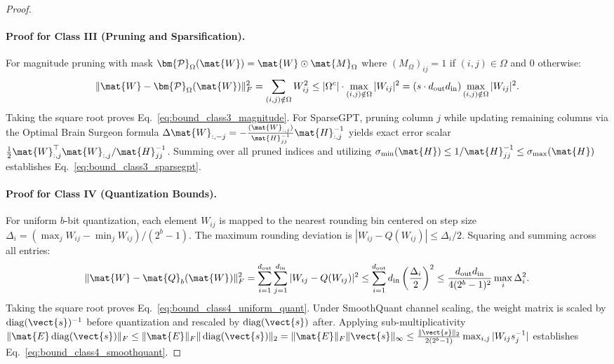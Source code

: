 \begin{proof}
\paragraph{Proof for Class III (Pruning and Sparsification).}
For magnitude pruning with mask $\bm{\mathcal{P}}_\Omega(\mat{W}) = \mat{W} \odot \mat{M}_\Omega$ where $(M_\Omega)_{ij} = 1$ if $(i,j) \in \Omega$ and $0$ otherwise:
\begin{equation}
\|\mat{W} - \bm{\mathcal{P}}_\Omega(\mat{W})\|_F^2 = \sum_{(i,j) \notin \Omega} W_{ij}^2 \le |\Omega^c| \cdot \max_{(i,j) \notin \Omega} |W_{ij}|^2 = (s \cdot d_{\text{out}} d_{\text{in}}) \max_{(i,j) \notin \Omega} |W_{ij}|^2.
\end{equation}
Taking the square root proves Eq.~\eqref{eq:bound_class3_magnitude}. For SparseGPT, pruning column $j$ while updating remaining columns via the Optimal Brain Surgeon formula $\Delta \mat{W}_{:, -j} = - \frac{(\mat{W}_{:, j})}{\mat{H}^{-1}_{jj}} \mat{H}^{-1}_{:, j}$ yields exact error scalar $\frac{1}{2} \mat{W}_{:, j}^\top \mat{W}_{:, j} / \mat{H}^{-1}_{jj}$. Summing over all pruned indices and utilizing $\sigma_{\min}(\mat{H}) \le 1 / \mat{H}^{-1}_{jj} \le \sigma_{\max}(\mat{H})$ establishes Eq.~\eqref{eq:bound_class3_sparsegpt}.

\paragraph{Proof for Class IV (Quantization Bounds).}
For uniform $b$-bit quantization, each element $W_{ij}$ is mapped to the nearest rounding bin centered on step size $\Delta_i = (\max_j W_{ij} - \min_j W_{ij}) / (2^b - 1)$. The maximum rounding deviation is $|W_{ij} - Q(W_{ij})| \le \Delta_i / 2$. Squaring and summing across all entries:
\begin{equation}
\|\mat{W} - \mat{Q}_b(\mat{W})\|_F^2 = \sum_{i=1}^{d_{\text{out}}} \sum_{j=1}^{d_{\text{in}}} |W_{ij} - Q(W_{ij})|^2 \le \sum_{i=1}^{d_{\text{out}}} d_{\text{in}} \left( \frac{\Delta_i}{2} \right)^2 \le \frac{d_{\text{out}} d_{\text{in}}}{4 (2^b - 1)^2} \max_i \Delta_i^2.
\end{equation}
Taking the square root proves Eq.~\eqref{eq:bound_class4_uniform_quant}. Under SmoothQuant channel scaling, the weight matrix is scaled by $\operatorname{diag}(\vect{s})^{-1}$ before quantization and rescaled by $\operatorname{diag}(\vect{s})$ after. Applying sub-multiplicativity $\|\mat{E} \operatorname{diag}(\vect{s})\|_F \le \|\mat{E}\|_F \|\operatorname{diag}(\vect{s})\|_2 = \|\mat{E}\|_F \|\vect{s}\|_\infty \le \frac{\|\vect{s}\|_2}{2(2^b-1)} \max_{i,j} |W_{ij} s_j^{-1}|$ establishes Eq.~\eqref{eq:bound_class4_smoothquant}.


\end{proof}

